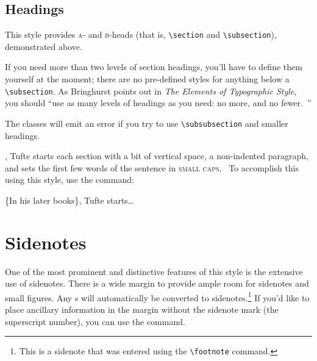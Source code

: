 \subsection{Headings}\label{sec:headings}
This style provides \textsc{a}- and \textsc{b}-heads (that is,
\Verb|\section| and \Verb|\subsection|), demonstrated above.

If you need more than two levels of section headings, you'll have to define
them yourself at the moment; there are no pre-defined styles for anything below
a \Verb|\subsection|.  As Bringhurst points out in \textit{The Elements of
Typographic Style}, you should ``use as many levels of
headings as you need: no more, and no fewer.~\parencite{Bringhurst2005}''

The \TL classes will emit an error if you try to use
\linebreak\Verb|\subsubsection| and smaller headings.

, Tufte
starts each section with a bit of vertical space, a non-indented paragraph,
and sets the first few words of the sentence in 
\textsc{small caps}.~\parencite{Tufte2006}  
To
accomplish this using this style, use the  command:
\begin{docspec}
  \{In his later books\}, Tufte starts\ldots
\end{docspec}


\section{Sidenotes}\label{sec:sidenotes}
One of the most prominent and distinctive features of this style is the
extensive use of sidenotes.  There is a wide margin to provide ample room
for sidenotes and small figures.  Any s will automatically
be converted to sidenotes.\footnote{This is a sidenote that was entered
using the \texttt{\textbackslash footnote} command.}  If you'd like to place ancillary
information in the margin without the sidenote mark (the superscript
number), you can use the  command.

